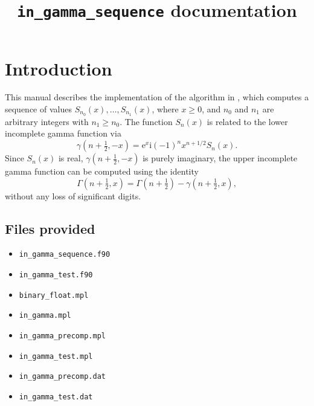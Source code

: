 \documentclass[paper=a4,smallheadings]{scrartcl}
\makeatletter
\newcommand{\re} {\mathrm e}
\newcommand{\ri} {\mathrm i}
\def\author#1{\gdef\@author{\normalsize{#1}}}%
\makeatother
\begin{document}
\title{\texttt{in\_gamma\_sequence} documentation}
\author{Ian Thompson}
\date{}
%
\maketitle
\tableofcontents
\newpage
%
\section{Introduction}
This manual describes the implementation of the algorithm in
\cite{Thompson11b}, which computes a sequence of values
$S_{n_0}(x),\ldots,S_{n_1}(x)$, where $x\ge 0$, and $n_0$ and $n_1$
are arbitrary integers with $n_1\ge n_0$. The function $S_n(x)$ is
related to the lower incomplete gamma function via
\begin{equation}\label{s-gamma}
\gamma(n+\tfrac{1}{2},-x) = \re^x\ri(-1)^n x^{n+1/2} S_n(x).
\end{equation}
Since $S_n(x)$ is real, $\gamma(n+\tfrac{1}{2},-x)$ is purely
imaginary, the upper incomplete gamma function can be computed
using the identity
\begin{equation}\label{split}
\Gamma(n+\tfrac{1}{2},x) = \Gamma(n+\tfrac{1}{2}) - \gamma(n+\tfrac{1}{2},x),
\end{equation}
without any loss of significant digits.
%
\subsection{Files provided}
\begin{itemize}
\setlength{\itemsep}{0pt}
\item \texttt{in\_gamma\_sequence.f90}
\item \texttt{in\_gamma\_test.f90}
\item \texttt{binary\_float.mpl}
\item \texttt{in\_gamma.mpl}
\item \texttt{in\_gamma\_precomp.mpl}
\item \texttt{in\_gamma\_test.mpl}
\item \texttt{in\_gamma\_precomp.dat}
\item \texttt{in\_gamma\_test.dat}
\end{itemize}
%
\end{document}
